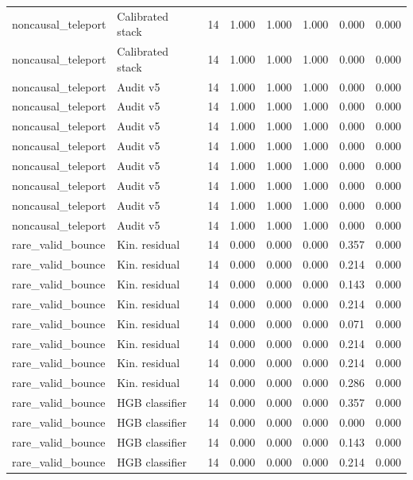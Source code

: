 {\begin{longtable}{llrrrrrr}
noncausal\_teleport & Calibrated stack & 14 & 1.000 & 1.000 & 1.000 & 0.000 & 0.000 \\
noncausal\_teleport & Calibrated stack & 14 & 1.000 & 1.000 & 1.000 & 0.000 & 0.000 \\
noncausal\_teleport & Audit v5 & 14 & 1.000 & 1.000 & 1.000 & 0.000 & 0.000 \\
noncausal\_teleport & Audit v5 & 14 & 1.000 & 1.000 & 1.000 & 0.000 & 0.000 \\
noncausal\_teleport & Audit v5 & 14 & 1.000 & 1.000 & 1.000 & 0.000 & 0.000 \\
noncausal\_teleport & Audit v5 & 14 & 1.000 & 1.000 & 1.000 & 0.000 & 0.000 \\
noncausal\_teleport & Audit v5 & 14 & 1.000 & 1.000 & 1.000 & 0.000 & 0.000 \\
noncausal\_teleport & Audit v5 & 14 & 1.000 & 1.000 & 1.000 & 0.000 & 0.000 \\
noncausal\_teleport & Audit v5 & 14 & 1.000 & 1.000 & 1.000 & 0.000 & 0.000 \\
noncausal\_teleport & Audit v5 & 14 & 1.000 & 1.000 & 1.000 & 0.000 & 0.000 \\
rare\_valid\_bounce & Kin. residual & 14 & 0.000 & 0.000 & 0.000 & 0.357 & 0.000 \\
rare\_valid\_bounce & Kin. residual & 14 & 0.000 & 0.000 & 0.000 & 0.214 & 0.000 \\
rare\_valid\_bounce & Kin. residual & 14 & 0.000 & 0.000 & 0.000 & 0.143 & 0.000 \\
rare\_valid\_bounce & Kin. residual & 14 & 0.000 & 0.000 & 0.000 & 0.214 & 0.000 \\
rare\_valid\_bounce & Kin. residual & 14 & 0.000 & 0.000 & 0.000 & 0.071 & 0.000 \\
rare\_valid\_bounce & Kin. residual & 14 & 0.000 & 0.000 & 0.000 & 0.214 & 0.000 \\
rare\_valid\_bounce & Kin. residual & 14 & 0.000 & 0.000 & 0.000 & 0.214 & 0.000 \\
rare\_valid\_bounce & Kin. residual & 14 & 0.000 & 0.000 & 0.000 & 0.286 & 0.000 \\
rare\_valid\_bounce & HGB classifier & 14 & 0.000 & 0.000 & 0.000 & 0.357 & 0.000 \\
rare\_valid\_bounce & HGB classifier & 14 & 0.000 & 0.000 & 0.000 & 0.000 & 0.000 \\
rare\_valid\_bounce & HGB classifier & 14 & 0.000 & 0.000 & 0.000 & 0.143 & 0.000 \\
rare\_valid\_bounce & HGB classifier & 14 & 0.000 & 0.000 & 0.000 & 0.214 & 0.000 \\

\end{longtable}}
